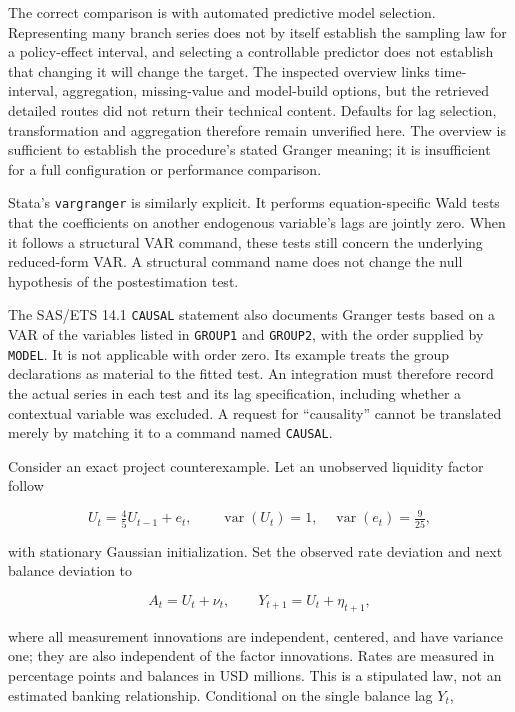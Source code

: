 The correct comparison is with automated predictive model selection.
Representing many branch series does not by itself establish the
sampling law for a policy-effect interval, and selecting a controllable
predictor does not establish that changing it will change the target.
The inspected overview links time-interval, aggregation, missing-value
and model-build options, but the retrieved detailed routes did not
return their technical content. Defaults for lag selection,
transformation and aggregation therefore remain unverified here. The
overview is sufficient to establish the procedure's stated Granger
meaning; it is insufficient for a full configuration or performance
comparison.

Stata's \texttt{vargranger} is similarly explicit. It performs
equation-specific Wald tests that the coefficients on another endogenous
variable's lags are jointly zero. When it follows a structural VAR
command, these tests still concern the underlying reduced-form VAR. A
structural command name does not change the null hypothesis of the
postestimation test. \citep{exec13_ct_stata_granger}

The SAS/ETS 14.1 \texttt{CAUSAL} statement also documents Granger tests
based on a VAR of the variables listed in \texttt{GROUP1} and
\texttt{GROUP2}, with the order supplied by \texttt{MODEL}. It is not
applicable with order zero. Its example treats the group declarations as
material to the fitted test. An integration must therefore record the
actual series in each test and its lag specification, including whether
a contextual variable was excluded. A request for ``causality'' cannot
be translated merely by matching it to a command named
\texttt{CAUSAL}.~\citep{exec13_ct_sas_causal}

Consider an exact project counterexample. Let an unobserved liquidity
factor follow

\[
 U_t=\tfrac45U_{t-1}+e_t,\qquad
 \operatorname{var}(U_t)=1,\quad \operatorname{var}(e_t)=\tfrac9{25},
\]

with stationary Gaussian initialization. Set the observed rate deviation
and next balance deviation to

\[
 A_t=U_t+\nu_t,\qquad Y_{t+1}=U_t+\eta_{t+1},
\]

where all measurement innovations are independent, centered, and have
variance one; they are also independent of the factor innovations. Rates
are measured in percentage points and balances in USD millions. This is
a stipulated law, not an estimated banking relationship. Conditional on
the single balance lag \(Y_t\),

